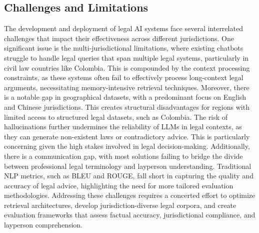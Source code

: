 \subsection{Challenges and Limitations}
The development and deployment of legal AI systems face several interrelated challenges that impact their 
effectiveness across different jurisdictions. One significant issue is the multi-jurisdictional limitations, 
where existing chatbots struggle to handle legal queries that span multiple legal systems, particularly in civil 
law countries like Colombia. This is compounded by the context processing constraints, as these systems often fail to 
effectively process long-context legal arguments, necessitating memory-intensive retrieval techniques.
Moreover, there is a notable gap in geographical datasets, with a predominant focus on English and Chinese jurisdictions. 
This creates structural disadvantages for regions with limited access to structured legal datasets, such as Colombia. 
The risk of hallucinations further undermines the reliability of LLMs in legal contexts, as they can generate non-existent 
laws or contradictory advice. This is particularly concerning given the high stakes involved in legal decision-making. Additionally, 
there is a communication gap, with most solutions failing to bridge the divide between professional legal terminology and layperson 
understanding. Traditional NLP metrics, such as BLEU and ROUGE, fall short in capturing the quality and accuracy of legal advice, 
highlighting the need for more tailored evaluation methodologies.
Addressing these challenges requires a concerted effort to optimize retrieval architectures, 
develop jurisdiction-diverse legal corpora, and create evaluation frameworks that assess factual accuracy, 
jurisdictional compliance, and layperson comprehension.

